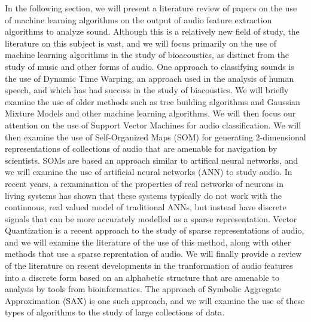 In the following section, we will present a literature review of
papers on the use of machine learning algorithms on the output of
audio feature extraction algorithms to analyze sound.  Although this
is a relatively new field of study, the literature on this subject is
vast, and we will focus primarily on the use of machine learning
algorithms in the study of bioacoustics, as distinct from the study of
music and other forms of audio.  One approach to classifying sounds is
the use of Dynamic Time Warping, an approach used in the analysis of
human speech, and which has had success in the study of
biacoustics. We will briefly examine the use of older methods such as
tree building algorithms and Gaussian Mixture Models and other machine
learning algorithms.  We will then focus our attention on the use of
Support Vector Machines for audio classification.  We will then
examine the use of Self-Organized Maps (SOM) for generating
2-dimensional representations of collections of audio that are
amenable for navigation by scientists.  SOMs are based an approach
similar to artifical neural networks, and we will examine the use of
artificial neural networks (ANN) to study audio.  In recent years, a
rexamination of the properties of real networks of neurons in living
systems has shown that these systems typically do not work with the
continuous, real valued model of traditional ANNs, but instead have
discrete signals that can be more accurately modelled as a sparse
representation.  Vector Quantization is a recent approach to the study
of sparse representations of audio, and we will examine the literature
of the use of this method, along with other methods that use a sparse
reprentation of audio.  We will finally provide a review of the
literature on recent developments in the tranformation of audio
features into a discrete form based on an alphabetic structure that
are amenable to analysis by tools from bioinformatics.  The approach
of Symbolic Aggregate Approximation (SAX) is one such approach, and we
will examine the use of these types of algorithms to the study of
large collections of data.

